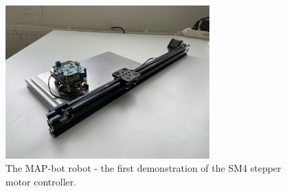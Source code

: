 \begin{figure}[H]
    \centering
    \includegraphics[width=0.7\textwidth]{obrazky/rail}
    \caption{The MAP-bot robot - the first demonstration of the SM4 stepper motor controller.}
    \label{fig:rail_demonstrator}
\end{figure}